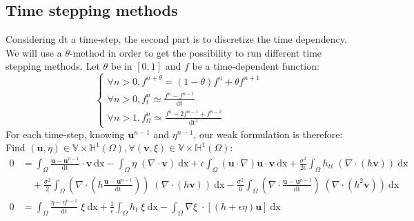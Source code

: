 \documentclass[11pt,a4paper]{article}
\begin{document}
\subsection{Time stepping methods}	
	Considering $\mathrm{dt}$ a time-step, the second part is to discretize the time dependency. We will use a $\theta$-method in order to get the possibility to run different time stepping methods. Let $\theta$ be in $[0,1] $ and $f$ be a time-dependent function: 	
	\begin{equation}
		\left\lbrace
			\begin{array}{l}
				\displaystyle \forall n > 0, f^{n+\theta} = (1-\theta)f^{n} + \theta f^{n+1}\\
				\displaystyle \forall n > 0, f_t^n \simeq \frac{f^n - f^{n-1}}{\mathrm{dt}} \\
				\displaystyle \forall n > 1, f_{tt}^n \simeq \frac{f^n -2f^{n-1} + f^{n-2}}{\mathrm{dt^2}} 
			\end{array}
		\right.
	\end{equation}
	For each time-step, knowing $\mathbf{u}^{n-1}$ and $\eta^{n-1}$, our weak formulation is therefore: Find $(\mathbf{u},\eta) \in \mathbb{V} \times \mathbb{H}^1(\Omega), \forall (\mathbf{v},\xi) \in \mathbb{V} \times \mathbb{H}^1(\Omega)$: 
	\begin{equation}
		\begin{split}
			0 &= \int_{\Omega} \! \frac{\mathbf{u} - \mathbf{u}^{n-1}}{\mathrm{dt}} \cdot \mathbf{v} \: \mathrm{dx} - \int_{\Omega} \! \eta \; (\nabla \cdot \mathbf{v}) \: \mathrm{dx} + \epsilon \! \int_{\Omega} \! (\mathbf{u} \cdot \nabla ) \mathbf{u} \cdot \mathbf{v} \: \mathrm{dx} + \frac{\sigma^2}{2 \epsilon} \! \int_{\Omega} \! h_{tt}  \; (\nabla \cdot( h \mathbf{v})) \: \mathrm{dx} \\ 
			&\quad + \frac{\sigma^2}{2} \! \int_{\Omega} \!  (\nabla \cdot (h \frac{\mathbf{u} - \mathbf{u}^{n-1}}{\mathrm{dt}})) \; (\nabla \cdot (h \mathbf{v}) )\: \mathrm{dx} - \frac{\sigma^2}{6} \! \int_{\Omega} \! (\nabla \cdot \frac{\mathbf{u} - \mathbf{u}^{n-1}}{\mathrm{dt}}) \; (\nabla  \cdot (h^2  \mathbf{v})) \: \mathrm{dx} \\
			\displaystyle 0 &= \int_{\Omega}\! \frac{\eta - \eta^{n-1}}{\mathrm{dt}} \; \xi \: \mathrm{dx} +\frac{1}{\epsilon}\int_{\Omega}\! h_t \; \xi \: \mathrm{dx} -\int_{\Omega}\! \nabla \xi \; \cdot [(h+\epsilon\eta) \mathbf{u}]  \: \mathrm{dx}
		\end{split}
	\end{equation}
	
\end{document}
